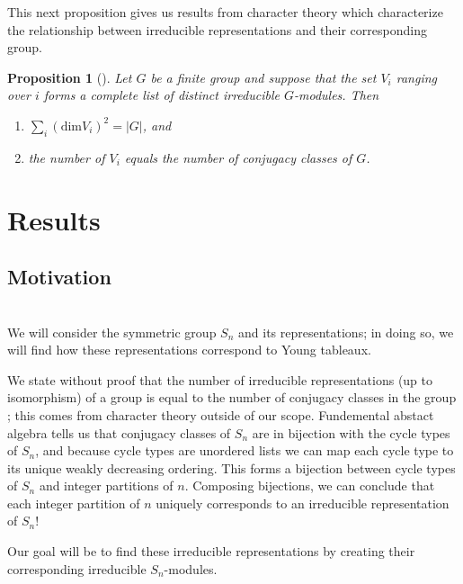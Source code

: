 \documentclass[11 pt]{amsart}
\theoremstyle{plain}   %
\newtheorem{prop}{Proposition}[section]
\theoremstyle{definition}
\theoremstyle{remark}
\numberwithin{equation}{section}
\def\dim{\mathrm{dim}}
\begin{document}
    This next proposition gives us results from character theory which characterize the relationship between irreducible representations
    and their corresponding group.
    
  \begin{prop}[{\cite[Proposition 1.10.1]{sagan}}]
      Let $G$ be a finite group and suppose that the set $V_i$ ranging over $i$ forms a complete list of
      distinct irreducible $G$-modules. Then
      \begin{enumerate}
      \item $\sum_i (\dim V_i)^2 = |G|$, and
      \item the number of $V_i$ equals the number of conjugacy classes of $G$.
      \end{enumerate}
    \end{prop}
  
  

    



  \section{Results}\label{results}
  \subsection{Motivation}\label{motivation} \hfill\\
We will consider the symmetric group $S_n$ and its representations; in doing so, we will find how these representations correspond to Young tableaux. \par
We state without proof that the number of irreducible representations (up to isomorphism) of a group is equal to the number of conjugacy classes in
the group \cite[Proposition 1.10.1]{sagan}; this comes from character theory outside of our scope. Fundemental abstact algebra tells us that 
conjugacy classes of $S_n$ are in bijection with the cycle types of $S_n$,
and because cycle types are unordered lists we can map each cycle type to its unique weakly decreasing ordering.
This forms a bijection between cycle types of $S_n$ and integer partitions of $n$.
Composing bijections, we can conclude that each integer partition of $n$ uniquely corresponds to an irreducible representation of $S_n$! \par
Our goal will be to find these irreducible representations by creating their corresponding irreducible $S_n$-modules.
\end{document}
